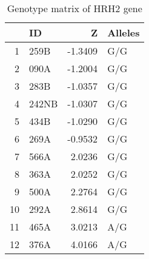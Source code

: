 \documentclass{article}
\begin{document}
\begin{table}[tbp]
\centering
\caption{Genotype matrix of HRH2 gene} 
\label{tab:a1F}
{\small
\begin{tabular}{rlrl}
  \hline
 & ID & Z & Alleles \\ 
  \hline
1 & 259B & -1.3409 & G/G \\ 
  2 & 090A & -1.2004 & G/G \\ 
  3 & 283B & -1.0357 & G/G \\ 
  4 & 242NB & -1.0307 & G/G \\ 
  5 & 434B & -1.0290 & G/G \\ 
  6 & 269A & -0.9532 & G/G \\ 
  7 & 566A & 2.0236 & G/G \\ 
  8 & 363A & 2.0252 & G/G \\ 
  9 & 500A & 2.2764 & G/G \\ 
  10 & 292A & 2.8614 & G/G \\ 
  11 & 465A & 3.0213 & A/G \\ 
  12 & 376A & 4.0166 & A/G \\ 
   \hline
\end{tabular}
}
\end{table}
\end{document}
